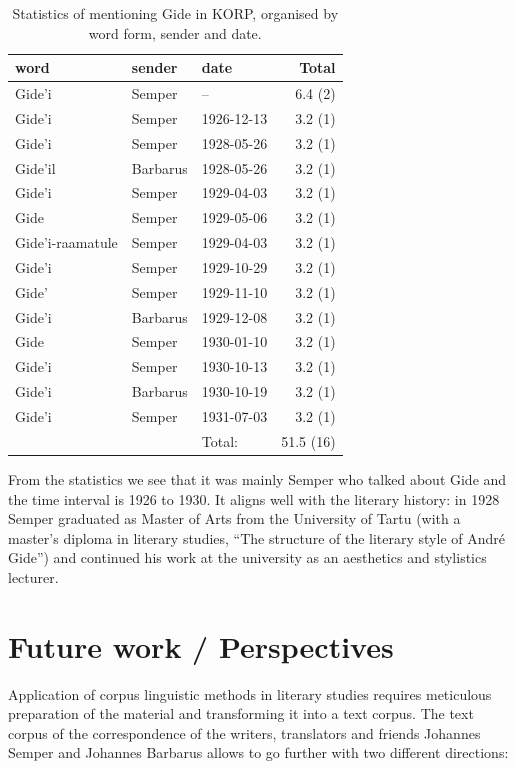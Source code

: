 \documentclass[runningheads]{llncs}
\begin{document}
\begin{table}
\caption{Statistics of mentioning Gide in KORP, organised by word form, sender and date.}\label{tab1}
\begin{tabular}{| l | l | l | r|}
  \hline
  word & sender & date & Total\\
  \hline
  Gide'i & Semper & -- & 6.4 (2)\\
  Gide'i & Semper & 1926-12-13 & 3.2 (1)\\
  Gide'i & Semper & 1928-05-26 & 3.2 (1)\\
  Gide'il & Barbarus & 1928-05-26 & 3.2 (1)\\
  Gide'i & Semper & 1929-04-03 & 3.2 (1)\\
  Gide & Semper & 1929-05-06 & 3.2 (1)\\
  Gide'i-raamatule & Semper & 1929-04-03 & 3.2 (1)\\
  Gide'i & Semper & 1929-10-29 & 3.2 (1)\\
  Gide' & Semper & 1929-11-10 & 3.2 (1)\\
  Gide'i & Barbarus & 1929-12-08 & 3.2 (1)\\
  Gide & Semper & 1930-01-10 & 3.2 (1)\\
  Gide'i & Semper & 1930-10-13 & 3.2 (1)\\
  Gide'i & Barbarus & 1930-10-19 & 3.2 (1)\\
  Gide'i & Semper & 1931-07-03 & 3.2 (1)\\
  \hline
  &&Total:&51.5 (16)\\
\hline
\end{tabular}
\end{table}


From the statistics we see that it was mainly Semper who talked about Gide and the time interval is 1926 to 1930. It aligns well with the literary history: in 1928 Semper graduated as Master of Arts from the University of Tartu (with a master’s diploma in literary studies, “The structure of the literary style of Andr\'e Gide”) and continued his work at the university as an aesthetics and stylistics lecturer. 

\section{Future work / Perspectives}

Application of corpus linguistic methods in literary studies requires meticulous preparation of the material and transforming it into a text corpus. The text corpus of the correspondence of the writers, translators and friends Johannes Semper and Johannes Barbarus allows to go further with two different directions:
\end{document}
